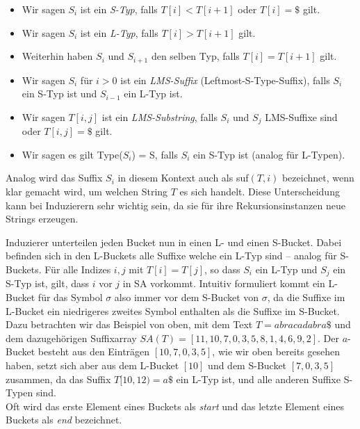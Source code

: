 \begin{itemize}
\item Wir sagen $S_i$ ist ein \textit{S-Typ}, falls $T[i] < T[i+1]$ oder $T[i] = \$$ gilt.
\item Wir sagen $S_i$ ist ein \textit{L-Typ}, falls $T[i] > T[i+1]$ gilt.
\item Weiterhin haben $S_i$ und $S_{i+1}$ den selben Typ, falls $T[i] = T[i+1]$ gilt.
\item Wir sagen $S_i$ für $i > 0$ ist ein \textit{LMS-Suffix} (Leftmost-S-Type-Suffix), falls $S_i$ ein S-Typ ist und $S_{i-1}$ ein L-Typ ist.
\item Wir sagen $T[i,j]$ ist ein \textit{LMS-Substring}, falls $S_i$ und $S_j$ LMS-Suffixe sind oder $T[i,j] = \$$ gilt.
\item Wir sagen es gilt Type($S_i$) = S, falls $S_i$ ein S-Typ ist (analog für L-Typen).
\end{itemize}

Analog wird das Suffix $S_i$ in diesem Kontext auch als suf$(T,i)$ bezeichnet, wenn klar gemacht wird, um welchen String $T$ es sich handelt. Diese Unterscheidung kann bei Induzierern sehr wichtig sein, da sie für ihre Rekursionsinstanzen neue Strings erzeugen.

Induzierer unterteilen jeden Bucket nun in einen L- und einen S-Bucket. Dabei befinden sich in den L-Buckets alle Suffixe welche ein L-Typ sind -- analog für S-Buckets. Für alle Indizes $i,j$ mit $T[i] = T[j]$, so dass $S_i$ ein L-Typ und $S_j$ ein S-Typ ist, gilt, dass $i$ vor $j$ in SA vorkommt. Intuitiv formuliert kommt ein L-Bucket für das Symbol $\sigma$ also immer vor dem S-Bucket von $\sigma$, da die Suffixe im L-Bucket ein niedrigeres zweites Symbol enthalten als die Suffixe im S-Bucket. \\
Dazu betrachten wir das Beispiel von oben, mit dem Text $T = abracadabra\$$ und dem dazugehörigen Suffixarray $SA(T) = [11, 10, 7, 0, 3, 5, 8, 1, 4, 6, 9, 2]$. Der $a$-Bucket besteht aus den Einträgen $[10,7,0,3,5]$, wie wir oben bereits gesehen haben, setzt sich aber aus dem L-Bucket $[10]$ und dem S-Bucket $[7,0,3,5]$ zusammen, da das Suffix $T[10,12) = a\$$ ein L-Typ ist, und alle anderen Suffixe S-Typen sind. \\
Oft wird das erste Element eines Buckets als \textit{start} und das letzte Element eines Buckets als \textit{end} bezeichnet. \\

